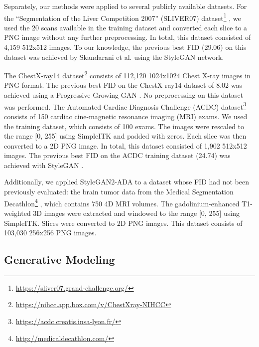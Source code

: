 \documentclass[runningheads]{llncs}
\begin{document}
Separately, our methods were applied to several publicly available datasets.
For the ``Segmentation of the Liver Competition 2007'' (SLIVER07) dataset\footnote{\url{https://sliver07.grand-challenge.org/}} \cite{Heimann2009}, we used the 20 scans available in the training dataset and converted each slice to a PNG image without any further preprocessing.
In total, this dataset consisted of 4,159 512x512 images.
To our knowledge, the previous best FID (29.06) on this dataset was achieved by Skandarani et al. using the StyleGAN network.

The ChestX-ray14 dataset\footnote{\url{https://nihcc.app.box.com/v/ChestXray-NIHCC}} \cite{wang2017chestxray} consists of 112,120 1024x1024 Chest X-ray images in PNG format.
The previous best FID on the ChestX-ray14 dataset of 8.02 was achieved using a Progressive Growing GAN \cite{Segal2021}. 
No preprocessing on this dataset was performed.
The Automated Cardiac Diagnosis Challenge (ACDC) dataset\footnote{\url{https://acdc.creatis.insa-lyon.fr/}} \cite{Bernard2018} consists of 150 cardiac cine-magnetic resonance imaging (MRI) exams.
We used the training dataset, which consists of 100 exams.
The images were rescaled to the range [0, 255] using SimpleITK \cite{Lowekamp2013} and padded with zeros.
Each slice was then converted to a 2D PNG image.
In total, this dataset consisted of 1,902 512x512 images.
The previous best FID on the ACDC training dataset (24.74) was achieved with StyleGAN \cite{skandarani2021}.

Additionally, we applied StyleGAN2-ADA to a dataset whose FID had not been previously evaluated: the brain tumor data from the Medical Segmentation Decathlon\footnote{\url{http://medicaldecathlon.com/}} \cite{Simpson2019}, which contains 750 4D MRI volumes.
The gadolinium-enhanced T1-weighted 3D images were extracted and windowed to the range [0, 255] using SimpleITK.
Slices were converted to 2D PNG images.
This dataset consists of 103,030 256x256 PNG images.

\subsection{Generative Modeling}
\end{document}
